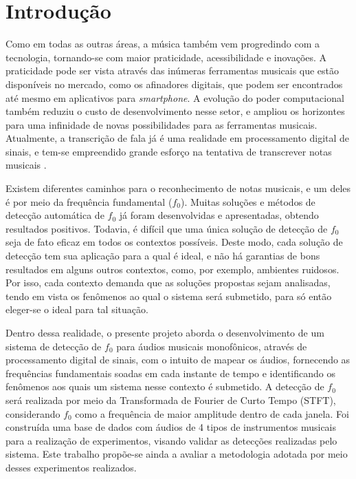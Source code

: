 
\chapter{Introdução} %

Como em todas as outras áreas, a música também vem progredindo com a tecnologia, tornando-se com maior praticidade, acessibilidade e inovações. A praticidade pode ser vista através das inúmeras ferramentas musicais que estão disponíveis no mercado, como os afinadores digitais, que podem ser encontrados até mesmo em aplicativos para \textit{smartphone}. A evolução do poder computacional também reduziu o custo de desenvolvimento nesse setor, e ampliou os horizontes para uma infinidade de novas possibilidades para as ferramentas musicais. Atualmente, a transcrição de fala já é uma realidade em processamento digital de sinais, e tem-se empreendido grande esforço na tentativa de transcrever notas musicais\cite{vass2004} \cite{amado2008} \cite{aoqui2014}.


Existem diferentes caminhos para o reconhecimento de notas musicais, e um deles é por meio da frequência fundamental ($f_0$). Muitas soluções e métodos de detecção automática de $f_0$ já foram desenvolvidas e apresentadas, obtendo resultados positivos. Todavia, é difícil que uma única solução de detecção de $f_0$ seja de fato eficaz em todos os contextos possíveis. Deste modo, cada solução de detecção tem sua aplicação para a qual é ideal, e não há garantias de bons resultados em alguns outros contextos, como, por exemplo, ambientes ruidosos. Por isso, cada contexto demanda que as soluções propostas sejam analisadas, tendo em vista os fenômenos ao qual o sistema será submetido, para só então eleger-se o ideal para tal situação.


Dentro dessa realidade, o presente projeto aborda o desenvolvimento de um sistema de detecção de $f_0$ para áudios musicais monofônicos, através de processamento digital de sinais, com o intuito de mapear os áudios, fornecendo as frequências fundamentais soadas em cada instante de tempo e identificando os fenômenos aos quais um sistema nesse contexto é submetido. A detecção de $f_0$ será realizada por meio da Transformada de Fourier de Curto Tempo (STFT), considerando $f_0$ como a frequência de maior amplitude dentro de cada janela. Foi construída uma base de dados com áudios de 4 tipos de instrumentos musicais para a realização de experimentos, visando validar as detecções realizadas pelo sistema. Este trabalho propõe-se ainda a avaliar a metodologia adotada por meio desses experimentos realizados.


